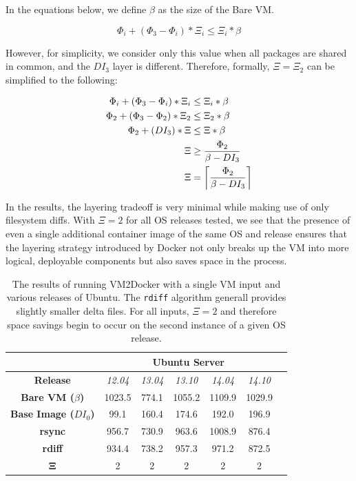 In the equations below, we define $\beta$ as the size of the Bare VM.

\begin{equation}
\Phi_i + (\Phi_3 - \Phi_i)* \Xi_i \le \Xi_i * \beta
\end{equation}

However, for simplicity, we consider only this value when all packages are shared in common, and the $DI_3$ layer is different. Therefore, formally, $\Xi = \Xi_2$ can be simplified to the following:

\begin{align*}
\Phi_i + (\Phi_3 - \Phi_i)* \Xi_i &\le \Xi_i * \beta \\
\Phi_2 + (\Phi_3 - \Phi_2)* \Xi_2 &\le \Xi_2 * \beta \\
\Phi_2 + (DI_3)* \Xi &\le \Xi * \beta\\
\Xi &\ge \frac{\Phi_2}{\beta - DI_3} \\
\Xi &= \ceil*{\frac{\Phi_2}{\beta - DI_3}}
\end{align*}


In the results, the layering tradeoff is very minimal while making use of only filesystem diffs. With $\Xi =2$ for all OS releases tested, we see that the presence of even a single additional container image of the same OS and release ensures that the layering strategy introduced by Docker not only breaks up the VM into more logical, deployable components but also saves space in the process.

\begin{table}[h]
\centering
    \begin{tabular}{| c | c | c | c | c | c | c |}
    \hline
& \multicolumn{5}{|c|}{\bfseries Ubuntu Server} \\ \hline
    \bfseries Release & \itshape 12.04 & \itshape 13.04 & \itshape 13.10 & \itshape 14.04 & \itshape 14.10 \\ \hline
    \bfseries Bare VM ($\beta$) & 1023.5 & 774.1 & 1055.2 & 1109.9 & 1029.9\\ \hline
    \bfseries Base Image ($DI_0$) & 99.1 & 160.4 & 174.6 & 192.0 & 196.9  \\ \hline
    \bfseries rsync & 956.7 & 730.9 & 963.6 & 1008.9 & 876.4\\ \hline 
    \bfseries rdiff & 934.4 & 738.2 & 957.3 & 971.2 & 872.5\\ \hline 
    \bfseries $\boldsymbol{\Xi}$ & 2 & 2 & 2 & 2 & 2  \\ \hline
    \end{tabular}
\caption{The results of running VM2Docker with a single VM input and various releases of Ubuntu. The \texttt{rdiff} algorithm generall provides slightly smaller delta files. For all inputs, $\Xi = 2$ and therefore space savings begin to occur on the second instance of a given OS release.}
\label{table:diff}
\end{table}

